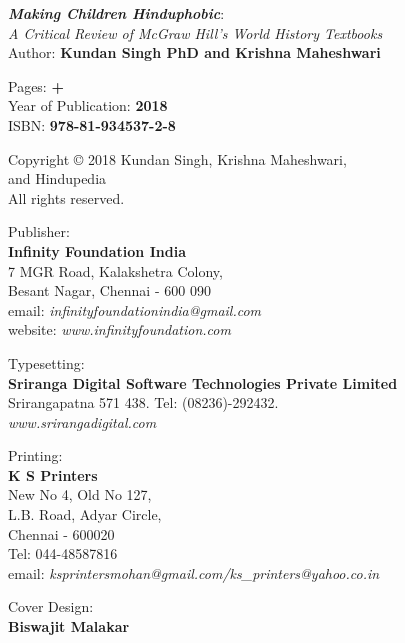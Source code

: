 \thispagestyle{empty}
\noindent
{\sl\bfseries Making Children Hinduphobic}:\\ 
{\sl A Critical Review of McGraw Hill’s World History Textbooks}\\[1pt] 
Author: {\bf Kundan Singh PhD and Krishna Maheshwari}\\[9pt]
\vfill

\noindent
Pages: {\bf \pageref{prelims} + \pageref{bookend}}\\
Year of Publication: {\bf 2018}\\
ISBN: {\bf 978-81-934537-2-8}
\vfill

\noindent
Copyright © 2018 Kundan Singh, Krishna Maheshwari,\\ and Hindupedia\\
All rights reserved.
\vfill



\noindent
Publisher:\\
\noindent
{\bf Infinity Foundation India}\\ 
7 MGR Road, Kalakshetra Colony,\\ 
Besant Nagar, Chennai - 600 090\\
email: {\sl infinityfoundationindia@gmail.com}\\
website: {\sl www.infinityfoundation.com} 
\vfill

\noindent
Typesetting:\\
{\bf Sriranga Digital Software Technologies Private Limited}\\ 
Srirangapatna 571 438. Tel: (08236)-292432.\\
{\sl www.srirangadigital.com}\\
\vfill

\noindent
Printing:\\
{\bf K S Printers}\\
New No 4, Old No 127,\\
L.B. Road, Adyar Circle,\\
Chennai - 600020\\
Tel: 044-48587816\\
email: {\sl ksprintersmohan@gmail.com/ks\_printers@yahoo.co.in}
\vfill

\vfill
\noindent
Cover Design:\\
{\bf Biswajit Malakar}
